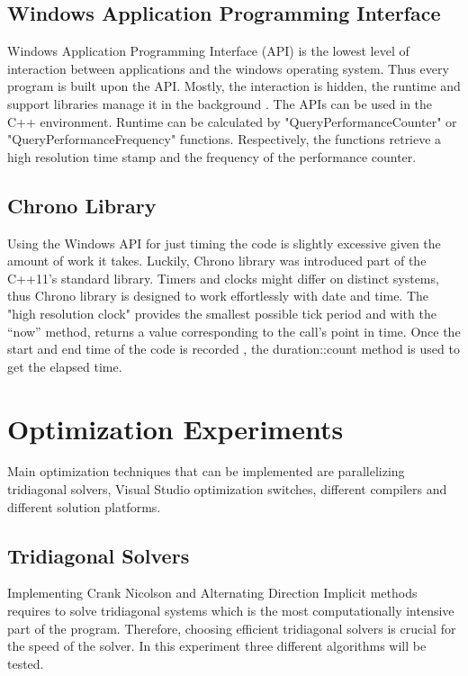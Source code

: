 \documentclass[12pt, oneside]{book}
\theoremstyle{plain}
\theoremstyle{definition}
\begin{document}
\subsection{Windows Application Programming Interface}
Windows Application Programming Interface (API) is the lowest level of interaction between applications and the windows operating system. Thus every program is built upon  the API. Mostly, the interaction is hidden, the runtime and support libraries manage it in the background \cite{windows}. The APIs can be used in the C++ environment. Runtime can be calculated by "QueryPerformanceCounter" or "QueryPerformanceFrequency"  functions. Respectively, the functions retrieve a high resolution time stamp and the frequency of the performance counter. 

\subsection{Chrono Library}
Using the Windows API for just timing the code is slightly excessive given the amount of work it takes. Luckily, Chrono library was introduced part of the C++11’s standard library.  Timers and clocks might differ on distinct systems, thus Chrono library is designed to work effortlessly with date and time. The "high resolution clock" provides the smallest possible tick period and with the “now” method, returns a value corresponding to the call’s point in time.  Once the start and end time of the code is recorded ,  the duration::count method is used to get the elapsed time.

\section{Optimization Experiments}
Main optimization techniques that can be implemented are parallelizing tridiagonal solvers, Visual Studio optimization switches, different compilers and different solution platforms.
\subsection{Tridiagonal Solvers}
Implementing Crank Nicolson and Alternating Direction Implicit methods requires to solve tridiagonal systems which is the most computationally intensive part of the program.  Therefore, choosing efficient tridiagonal solvers is crucial for the speed of the solver. In this experiment three different algorithms will be tested.
\end{document}
